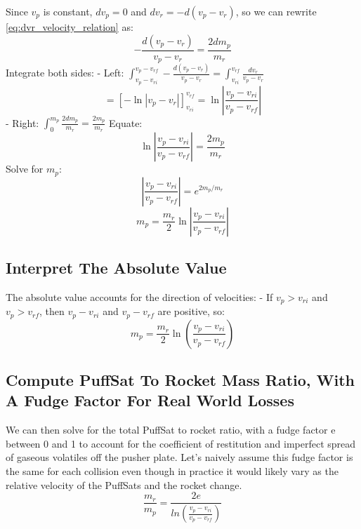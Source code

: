 \documentclass{article}
\begin{document}
Since \(v_p\) is constant,  \(dv_p = 0\) and  \(dv_r = -d(v_p-v_r)\), so we can rewrite \autoref{eq:dvr_velocity_relation} as:
\[
-\frac{d(v_p - v_r)}{v_p - v_r} = \frac{2 dm_p}{m_r}
\]
Integrate both sides:
- Left: \( \int_{v_p - v_{ri}}^{v_p - v_{rf}} -\frac{d(v_p - v_r)}{v_p - v_r} = \int_{v_{ri}}^{v_{rf}} \frac{dv_r}{v_p - v_r} \)
\[
= \left[ -\ln|v_p - v_r| \right]_{v_{ri}}^{v_{rf}} = \ln \left| \frac{v_p - v_{ri}}{v_p - v_{rf}} \right|
\]
- Right: \( \int_0^{m_p} \frac{2 dm_p}{m_r} = \frac{2 m_p}{m_r} \)
Equate:
\[
\ln \left| \frac{v_p - v_{ri}}{v_p - v_{rf}} \right| = \frac{2 m_p}{m_r}
\]
Solve for \( m_p \):
\[
\left| \frac{v_p - v_{ri}}{v_p - v_{rf}} \right| = e^{2 m_p / m_r}
\]
\begin{equation}
m_p = \frac{m_r}{2} \ln \left| \frac{v_p - v_{ri}}{v_p - v_{rf}} \right| 
\end{equation}
\subsection{Interpret The Absolute Value}   
The absolute value accounts for the direction of velocities:
- If \( v_p > v_{ri} \) and \( v_p > v_{rf} \),  then \( v_p - v_{ri} \) and \( v_p - v_{rf} \) are positive, so:
\[
m_p = \frac{m_r}{2} \ln \left( \frac{v_p - v_{ri}}{v_p - v_{rf}} \right)
\]
\subsection{Compute PuffSat To Rocket Mass Ratio, With A Fudge Factor For Real World Losses}

We can then solve for the total PuffSat to rocket ratio, with a fudge factor e between 0 and 1 to account for the coefficient of restitution and imperfect spread of gaseous volatiles off the pusher plate.   Let's naively assume this fudge factor is the same for each collision even though in practice it would likely vary as the relative velocity of the PuffSats and the rocket change.
\begin{equation}
\frac{m_r}{m_p} = \frac{2e}{ln(\frac{v_p-v_{ri}}{v_p-v_{rf}})}\label{eq:PuffSat_ratio}
\end{equation}
\end{document}
